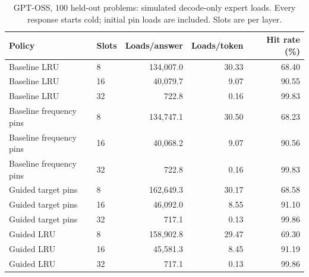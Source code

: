 \begin{table}[ht]
\centering\small
\caption{GPT-OSS, 100 held-out problems: simulated decode-only expert loads. Every response starts cold; initial pin loads are included. Slots are per layer.}
\label{tab:oss-cache-100-loads}
\begin{tabular}{llrrr}
\toprule
Policy & Slots & Loads/answer & Loads/token & Hit rate (\%) \\
\midrule
Baseline LRU & 8 & 134,007.0 & 30.33 & 68.40 \\
Baseline LRU & 16 & 40,079.7 & 9.07 & 90.55 \\
Baseline LRU & 32 & 722.8 & 0.16 & 99.83 \\
Baseline frequency pins & 8 & 134,747.1 & 30.50 & 68.23 \\
Baseline frequency pins & 16 & 40,068.2 & 9.07 & 90.56 \\
Baseline frequency pins & 32 & 722.8 & 0.16 & 99.83 \\
Guided target pins & 8 & 162,649.3 & 30.17 & 68.58 \\
Guided target pins & 16 & 46,092.0 & 8.55 & 91.10 \\
Guided target pins & 32 & 717.1 & 0.13 & 99.86 \\
Guided LRU & 8 & 158,902.8 & 29.47 & 69.30 \\
Guided LRU & 16 & 45,581.3 & 8.45 & 91.19 \\
Guided LRU & 32 & 717.1 & 0.13 & 99.86 \\
\bottomrule
\end{tabular}
\end{table}
